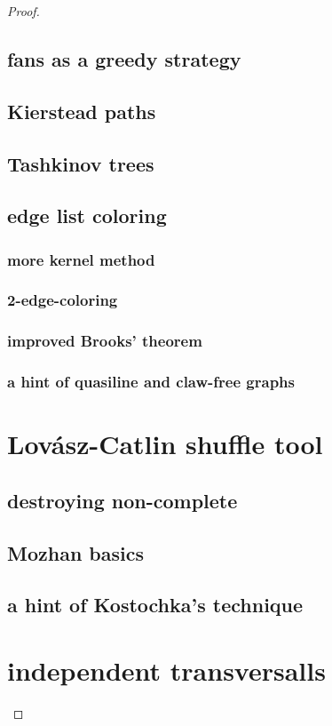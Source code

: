 \documentclass{amsbook}
\theoremstyle{plain}
\numberwithin{equation}{chapter}
\begin{document}
\begin{proof}
\section*{fans as a greedy strategy}
\section*{Kierstead paths}
\section*{Tashkinov trees}
\section*{edge list coloring}
\subsection*{more kernel method}
\subsection*{2-edge-coloring}
\subsection*{improved Brooks' theorem}
\subsection*{a hint of quasiline and claw-free graphs}

\chapter*{Lov\'{a}sz-Catlin shuffle tool}
\section*{destroying non-complete}
\section*{Mozhan basics}
\section*{a hint of Kostochka's technique}

\chapter*{independent transversalls}

\end{proof}
\end{document}
